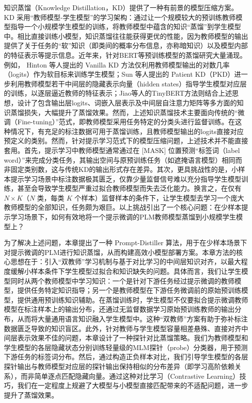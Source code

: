 \documentclass[../main.tex]{subfiles}
\begin{document}
知识蒸馏（Knowledge Distillation，KD）提供了一种有前景的模型压缩方案。KD 采用“教师模型-学生模型”的学习架构：通过让一个规模较大的预训练教师模型指导一个小规模学生模型的训练，将教师模型中蕴含的知识“蒸馏”到学生模型中。相比直接训练小模型，知识蒸馏往往能获得更优的性能，因为教师模型的输出提供了关于任务的“软”知识（即类间的概率分布信息，亦称暗知识）以及模型内部的特征表示等提示信息。近年来，针对BERT等预训练模型的蒸馏研究大量涌现。例如， Hinton 等人提出的 Vanilla KD 方法仅利用教师模型输出的对数几率（logits）作为软目标来训练学生模型；Sun 等人提出的 Patient KD（PKD）进一步利用教师模型若干中间层的隐藏表示向量（hidden states）指导学生模型对应层的训练，以逐层逼近教师的特征表示；Jiao等人的TinyBERT方法则结合上述思想，设计了包含输出层logits、词嵌入层表示及中间层自注意力矩阵等多方面的知识蒸馏损失，大幅提升了蒸馏效果。然而，上述知识蒸馏技术主要面向传统的“微调（Fine-tuning）”范式，即教师模型采用任务特定的分类头进行监督训练。在这种情况下，有充足的标注数据可用于蒸馏训练，且教师模型输出的logits直接对应预定义的类别。然而，针对提示学习范式下的模型压缩问题，上述技术并不能直接套用。首先，提示学习中教师模型通常通过在 [MASK] 位置预测“标签词（label word）”来完成分类任务，其输出空间与原预训练任务（如遮掩语言模型）相同而非固定类别数，这与传统KD的输出形式存在差异。其次，更具挑战性的是，小样本提示学习场景中标注数据极其匮乏，仅靠少量监督信号难以充分指导学生模型训练，甚至会导致学生模型严重过拟合教师模型而失去泛化能力。换言之，在仅有 $N\times K$（$N$ 类，每类 $K$ 个样本）监督样本的条件下，让学生模型去学习一个庞大教师模型的全部知识，任务颇为艰巨。以上挑战引出了一个核心问题：在少样本提示学习场景下，如何有效地将一个提示微调的PLM教师模型蒸馏到小规模学生模型上？

为了解决上述问题，本章提出了一种 Prompt-Distiller 算法，用于在少样本场景下对提示微调的PLM进行知识蒸馏，从而构建高效小模型部署方案。本章方法的核心思想在于：引入“双教师”学习机制与基于对比学习的中间层知识对齐，以最大程度缓解小样本条件下学生模型过拟合和知识缺失的问题。具体而言，我们让学生模型同时从两个教师模型中学习知识：一个是针对下游任务经过提示微调的教师模型，提供任务特定知识指导；另一个是教师模型在下游任务微调前的原始预训练模型，提供通用预训练知识辅助。在蒸馏训练时，学生模型不仅要拟合提示微调教师模型在标注样本上的输出分布，还通过无监督数据学习原始预训练教师的输出分布，从而将大量通用语言知识融入学生模型中。这种“双教师”方案有助于弥补标注数据匮乏导致的知识盲区。此外，针对教师与学生模型容量相差悬殊、直接对齐中间层表示效果不佳的问题，本章设计了一种探针对比蒸馏策略。我们为教师模型和学生模型的各层隐藏状态分别训练轻量级的MLM探针（probe）分类器，用于预测下游任务的标签词分布。然后，通过构造正负样本对比，我们引导学生模型的各层探针输出与教师模型对应层的探针输出保持相似的分布差异（即学习高阶依赖关系），而非简单逐点匹配隐藏向量。通过这种对比学习（Contrastive Learning）技巧，我们在一定程度上规避了大模型与小模型直接匹配带来的不适配问题，进一步提升了蒸馏效果。
\end{document}
